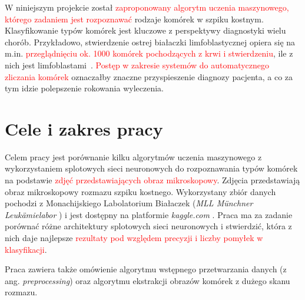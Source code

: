 W niniejszym projekcie został \textcolor{red}{zaproponowany algorytm uczenia maszynowego, którego zadaniem jest rozpoznawać} rodzaje komórek w szpiku kostnym.
Klasyfikowanie typów komórek jest kluczowe z perspektywy diagnostyki wielu chorób.
Przykładowo, stwierdzenie ostrej białaczki limfoblastycznej opiera się na m.in.
\textcolor{red}{przeglądnięciu ok. 1000 komórek pochodzących z krwi i stwierdzeniu}, ile z nich jest limfoblastami~\cite{blast_counting_diagnosis}.
\textcolor{red}{Postęp w zakresie systemów do automatycznego zliczania komórek} oznaczałby znaczne przyspieszenie diagnozy pacjenta, a co za tym idzie polepszenie rokowania wyleczenia.

\section{Cele i zakres pracy}

Celem pracy jest porównanie kilku algorytmów uczenia maszynowego z wykorzystaniem splotowych sieci neuronowych do rozpoznawania typów komórek na podstawie \textcolor{red}{zdjęć przedstawiających obraz mikroskopowy}.
Zdjęcia przedstawiają obraz mikroskopowy rozmazu szpiku kostnego. Wykorzystany zbiór danych pochodzi z
Monachijskiego Labolatorium Białaczek (\textit{MLL Münchner Leukämielabor} \cite{mll}) i jest dostępny na platformie \textit{kaggle.com} \cite{dataset}.
Praca ma za zadanie porównać różne architektury splotowych sieci neuronowych i stwierdzić, która z nich daje najlepsze \textcolor{red}{rezultaty pod względem precyzji i liczby pomyłek w klasyfikacji}.

Praca zawiera także omówienie algorytmu wstępnego przetwarzania danych (z ang. \textit{preprocessing}) oraz algorytmu ekstrakcji obrazów komórek z dużego skanu rozmazu.
